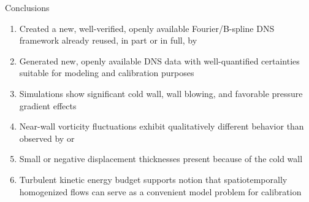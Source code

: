 \documentclass[mathserif]{beamer}
\begin{document}
\begin{frame}{Conclusions}
    \begin{enumerate}
        \item Created a new, well-verified, openly available Fourier/B-spline DNS framework
              already reused, in part or in full, by
              \citet{Malaya2012Estimating,
              Topalian2013Direct,
              Lee2013Petascale,
              Topalian2014Temporal,
              Topalian2014Spatiotemporal,
              Oliver2014Estimating,
              Lee2014Experiences,
              Lee2014Direct}
        \item Generated new, openly available DNS data with well-quantified certainties suitable for modeling and calibration purposes
        \item Simulations show significant cold wall, wall blowing, and favorable pressure gradient effects
        \item Near-wall vorticity fluctuations exhibit qualitatively different behavior than observed by \citet{Guarini2000Direct} or \citet{Spalart1988Direct}
        \item Small or negative displacement thicknesses present because of the cold wall
        \item Turbulent kinetic energy budget supports notion that spatiotemporally homogenized flows can serve as a convenient model problem for calibration
    \end{enumerate}
\end{frame}
\end{document}
